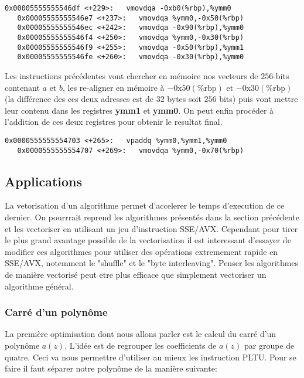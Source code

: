 \documentclass[12pt]{article}
\begin{document}
\vspace{1cm}
\begin{lstlisting}[style = Astyle]
   0x00005555555546df <+229>:	vmovdqa -0xb0(%rbp),%ymm0
   0x00005555555546e7 <+237>:	vmovdqa %ymm0,-0x50(%rbp)
   0x00005555555546ec <+242>:	vmovdqa -0x90(%rbp),%ymm0
   0x00005555555546f4 <+250>:	vmovdqa %ymm0,-0x30(%rbp)
   0x00005555555546f9 <+255>:	vmovdqa -0x50(%rbp),%ymm1
   0x00005555555546fe <+260>:	vmovdqa -0x30(%rbp),%ymm0
\end{lstlisting}
\vspace{1cm}
Les instructions précédentes vont chercher en mémoire nos vecteurs de $256$-bits contenant $a$ et $b$, les re-aligner en mémoire à  $-0\mathrm{x}50(\%\mathrm{rbp})$ et $-0\mathrm{x}30(\%\mathrm{rbp})$ (la différence des ces deux adresses est de $32$ bytes soit $256$ bits) puis vont mettre leur contenu dans les registres \textbf{ymm1} et \textbf{ymm0}. On peut enfin procéder à l'addition de ces deux registres pour obtenir le resultat final.

\begin{lstlisting}[style = Astyle]
   0x0000555555554703 <+265>:	vpaddq %ymm0,%ymm1,%ymm0
   0x0000555555554707 <+269>:	vmovdqa %ymm0,-0x70(%rbp)
\end{lstlisting}
\subsection{Applications}
La vetorisation d'un algorithme permet d'accelerer le temps d'execution de ce dernier. On pourrrait reprend les algorithmes présentés dans la section précédente et les vectoriser en utilisant un jeu d'instruction SSE/AVX. Cependant pour tirer le plus grand avantage possible de la vectorisation il est interessant d'essayer de modifier ces algorithmes pour utiliser des opérations extremement rapide en SSE/AVX, notemment le "shuffle" et le "byte interleaving". Penser les algorithmes de manière vectorisé peut etre plus efficace que simplement vectoriser un algorithme général.

\subsubsection{Carré d'un polynôme}
La première optimisation dont nous allons parler est le calcul du carré d'un polynôme $a(z)$. L'idée est de regrouper les coefficients de $a(z)$ par groupe de quatre. Ceci va nous permettre d'utiliser au mieux les instruction PLTU. Pour se faire il faut séparer notre polynôme de la manière suivante:
\end{document}

